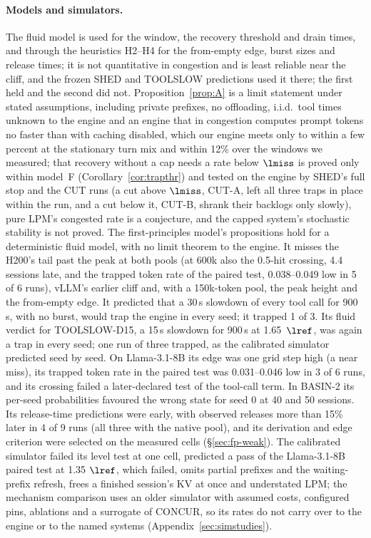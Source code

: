 \paragraph{Models and simulators.} The fluid model is used for the window, the recovery threshold and drain times, and through the heuristics H2--H4 for the from-empty edge, burst sizes and release times; it is not quantitative in congestion and is least reliable near the cliff, and the frozen SHED and TOOLSLOW predictions used it there; the first held and the second did not. Proposition~\ref{prop:A} is a limit statement under stated assumptions, including private prefixes, no offloading, i.i.d.\ tool times unknown to the engine and an engine that in congestion computes prompt tokens no faster than with caching disabled, which our engine meets only to within a few percent at the stationary turn mix and within 12\% over the windows we measured; that recovery without a cap needs a rate below $\lmiss$ is proved only within model~F (Corollary~\ref{cor:trapthr}) and tested on the engine by SHED's full stop and the CUT runs (a cut above $\lmiss$, CUT-A, left all three traps in place within the run, and a cut below it, CUT-B, shrank their backlogs only slowly), pure LPM's congested rate is a conjecture, and the capped system's stochastic stability is not proved. The first-principles model's propositions hold for a deterministic fluid model, with no limit theorem to the engine. It misses the H200's tail past the peak at both pools (at 600k also the 0.5-hit crossing, 4.4 sessions late, and the trapped token rate of the paired test, 0.038--0.049 low in 5 of 6 runs), vLLM's earlier cliff and, with a 150k-token pool, the peak height and the from-empty edge. It predicted that a 30\,s slowdown of every tool call for 900\,s, with no burst, would trap the engine in every seed; it trapped 1 of 3. Its fluid verdict for TOOLSLOW-D15, a 15\,s slowdown for 900\,s at 1.65~$\lref$, was again a trap in every seed; one run of three trapped, as the calibrated simulator predicted seed by seed. On Llama-3.1-8B its edge was one grid step high (a near miss), its trapped token rate in the paired test was 0.031--0.046 low in 3 of 6 runs, and its crossing failed a later-declared test of the tool-call term. In BASIN-2 its per-seed probabilities favoured the wrong state for seed 0 at 40 and 50 sessions. Its release-time predictions were early, with observed releases more than 15\% later in 4 of 9 runs (all three with the native pool), and its derivation and edge criterion were selected on the measured cells (\S\ref{sec:fp-weak}). The calibrated simulator failed its level test at one cell, predicted a pass of the Llama-3.1-8B paired test at 1.35 $\lref$, which failed, omits partial prefixes and the waiting-prefix refresh, frees a finished session's KV at once and understated LPM; the mechanism comparison uses an older simulator with assumed costs, configured pins, ablations and a surrogate of CONCUR, so its rates do not carry over to the engine or to the named systems (Appendix~\ref{sec:simstudies}).

